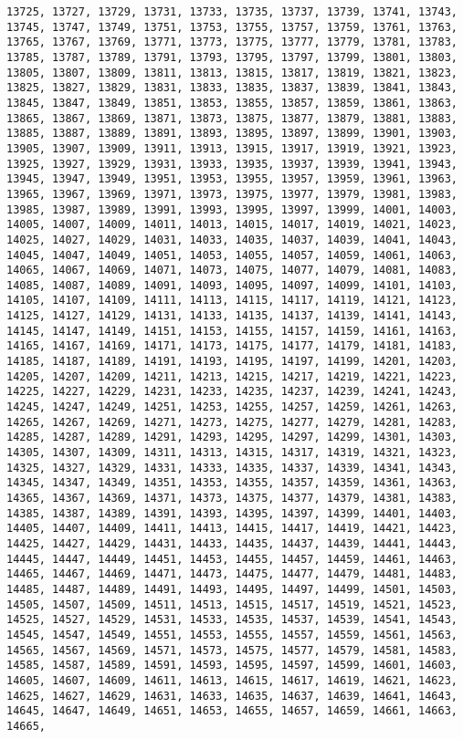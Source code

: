 \documentclass[11pt]{article}
\begin{document}
\begin{Verbatim}[commandchars=\\\{\}]
13725, 13727, 13729, 13731, 13733, 13735, 13737, 13739, 13741, 13743, 13745, 13747, 13749, 13751, 13753, 13755, 13757, 13759, 13761, 13763, 13765, 13767, 13769, 13771, 13773, 13775, 13777, 13779, 13781, 13783, 13785, 13787, 13789, 13791, 13793, 13795, 13797, 13799, 13801, 13803, 13805, 13807, 13809, 13811, 13813, 13815, 13817, 13819, 13821, 13823, 13825, 13827, 13829, 13831, 13833, 13835, 13837, 13839, 13841, 13843, 13845, 13847, 13849, 13851, 13853, 13855, 13857, 13859, 13861, 13863, 13865, 13867, 13869, 13871, 13873, 13875, 13877, 13879, 13881, 13883, 13885, 13887, 13889, 13891, 13893, 13895, 13897, 13899, 13901, 13903, 13905, 13907, 13909, 13911, 13913, 13915, 13917, 13919, 13921, 13923, 13925, 13927, 13929, 13931, 13933, 13935, 13937, 13939, 13941, 13943, 13945, 13947, 13949, 13951, 13953, 13955, 13957, 13959, 13961, 13963, 13965, 13967, 13969, 13971, 13973, 13975, 13977, 13979, 13981, 13983, 13985, 13987, 13989, 13991, 13993, 13995, 13997, 13999, 14001, 14003, 14005, 14007, 14009, 14011, 14013, 14015, 14017, 14019, 14021, 14023, 14025, 14027, 14029, 14031, 14033, 14035, 14037, 14039, 14041, 14043, 14045, 14047, 14049, 14051, 14053, 14055, 14057, 14059, 14061, 14063, 14065, 14067, 14069, 14071, 14073, 14075, 14077, 14079, 14081, 14083, 14085, 14087, 14089, 14091, 14093, 14095, 14097, 14099, 14101, 14103, 14105, 14107, 14109, 14111, 14113, 14115, 14117, 14119, 14121, 14123, 14125, 14127, 14129, 14131, 14133, 14135, 14137, 14139, 14141, 14143, 14145, 14147, 14149, 14151, 14153, 14155, 14157, 14159, 14161, 14163, 14165, 14167, 14169, 14171, 14173, 14175, 14177, 14179, 14181, 14183, 14185, 14187, 14189, 14191, 14193, 14195, 14197, 14199, 14201, 14203, 14205, 14207, 14209, 14211, 14213, 14215, 14217, 14219, 14221, 14223, 14225, 14227, 14229, 14231, 14233, 14235, 14237, 14239, 14241, 14243, 14245, 14247, 14249, 14251, 14253, 14255, 14257, 14259, 14261, 14263, 14265, 14267, 14269, 14271, 14273, 14275, 14277, 14279, 14281, 14283, 14285, 14287, 14289, 14291, 14293, 14295, 14297, 14299, 14301, 14303, 14305, 14307, 14309, 14311, 14313, 14315, 14317, 14319, 14321, 14323, 14325, 14327, 14329, 14331, 14333, 14335, 14337, 14339, 14341, 14343, 14345, 14347, 14349, 14351, 14353, 14355, 14357, 14359, 14361, 14363, 14365, 14367, 14369, 14371, 14373, 14375, 14377, 14379, 14381, 14383, 14385, 14387, 14389, 14391, 14393, 14395, 14397, 14399, 14401, 14403, 14405, 14407, 14409, 14411, 14413, 14415, 14417, 14419, 14421, 14423, 14425, 14427, 14429, 14431, 14433, 14435, 14437, 14439, 14441, 14443, 14445, 14447, 14449, 14451, 14453, 14455, 14457, 14459, 14461, 14463, 14465, 14467, 14469, 14471, 14473, 14475, 14477, 14479, 14481, 14483, 14485, 14487, 14489, 14491, 14493, 14495, 14497, 14499, 14501, 14503, 14505, 14507, 14509, 14511, 14513, 14515, 14517, 14519, 14521, 14523, 14525, 14527, 14529, 14531, 14533, 14535, 14537, 14539, 14541, 14543, 14545, 14547, 14549, 14551, 14553, 14555, 14557, 14559, 14561, 14563, 14565, 14567, 14569, 14571, 14573, 14575, 14577, 14579, 14581, 14583, 14585, 14587, 14589, 14591, 14593, 14595, 14597, 14599, 14601, 14603, 14605, 14607, 14609, 14611, 14613, 14615, 14617, 14619, 14621, 14623, 14625, 14627, 14629, 14631, 14633, 14635, 14637, 14639, 14641, 14643, 14645, 14647, 14649, 14651, 14653, 14655, 14657, 14659, 14661, 14663, 14665, 
\end{Verbatim}
\end{document}
